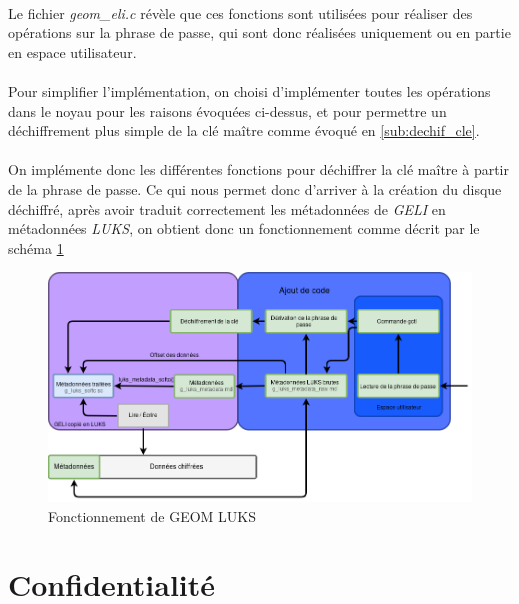 \paragraph{}
Le fichier {\em geom\_eli.c} révèle que ces fonctions sont utilisées pour réaliser
des opérations sur la phrase de passe, qui sont donc réalisées uniquement ou
en partie en espace utilisateur.

\paragraph{}
Pour simplifier l'implémentation, on choisi d'implémenter toutes les opérations
dans le noyau pour les raisons évoquées ci-dessus, et pour permettre un 
déchiffrement plus simple de la clé maître comme évoqué en \ref{sub:dechif_cle}.
\paragraph{}
On implémente donc les différentes fonctions pour déchiffrer la clé maître à
partir de la phrase de passe. Ce qui nous permet donc d'arriver à la création
du disque déchiffré, après avoir traduit correctement les métadonnées de
{\em GELI} en métadonnées {\em LUKS}, on obtient donc un fonctionnement
comme décrit par le schéma \ref{fig:fonctionnement}


\begin{figure}[h]
  \centering
  \includegraphics[width=\linewidth]{choix_developpement/utilisation_metadonnee_luks_2.png}
  \caption{\label{fig:fonctionnement}Fonctionnement de GEOM LUKS}
\end{figure}

\section{Confidentialité}
